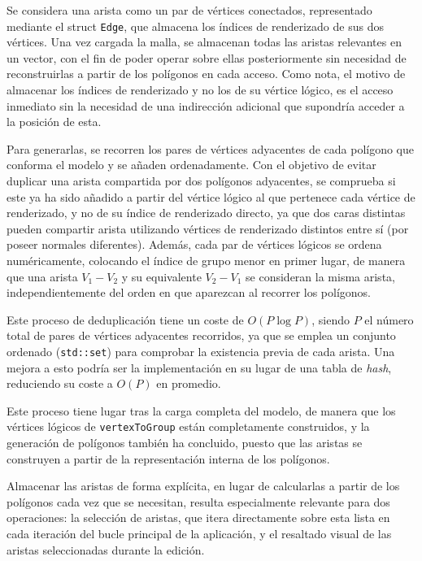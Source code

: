 Se considera una arista como un par de vértices conectados, representado mediante el struct \texttt{Edge}, que almacena los índices de renderizado de sus dos vértices. Una vez cargada la malla, se almacenan todas las aristas relevantes en un vector, con el fin de poder operar sobre ellas posteriormente sin necesidad de reconstruirlas a partir de los polígonos en cada acceso. Como nota, el motivo de almacenar los índices de renderizado y no los de su vértice lógico, es el acceso inmediato sin la necesidad de una indirección adicional que supondría acceder a la posición de esta.

Para generarlas, se recorren los pares de vértices adyacentes de cada polígono que conforma el modelo y se añaden ordenadamente. Con el objetivo de evitar duplicar una arista compartida por dos polígonos adyacentes, se comprueba si este ya ha sido añadido a partir del vértice lógico al que pertenece cada vértice de renderizado, y no de su índice de renderizado directo, ya que dos caras distintas pueden compartir arista utilizando vértices de renderizado distintos entre sí (por poseer normales diferentes). Además, cada par de vértices lógicos se ordena numéricamente, colocando el índice de grupo menor en primer lugar, de manera que una arista $V_1-V_2$ y su equivalente $V_2-V_1$ se consideran la misma arista, independientemente del orden en que aparezcan al recorrer los polígonos.

Este proceso de deduplicación tiene un coste de $O(P \log P)$, siendo $P$ el número total de pares de vértices adyacentes recorridos, ya que se emplea un conjunto ordenado (\texttt{std::set}) para comprobar la existencia previa de cada arista. Una mejora a esto podría ser la implementación en su lugar de una tabla de \textit{hash}, reduciendo su coste a $O(P)$ en promedio.

Este proceso tiene lugar tras la carga completa del modelo, de manera que los vértices lógicos de \texttt{vertexToGroup} están completamente construidos, y la generación de polígonos también ha concluido, puesto que las aristas se construyen a partir de la representación interna de los polígonos.

Almacenar las aristas de forma explícita, en lugar de calcularlas a partir de los polígonos cada vez que se necesitan, resulta especialmente relevante para dos operaciones: la selección de aristas, que itera directamente sobre esta lista en cada iteración del bucle principal de la aplicación, y el resaltado visual de las aristas seleccionadas durante la edición.

